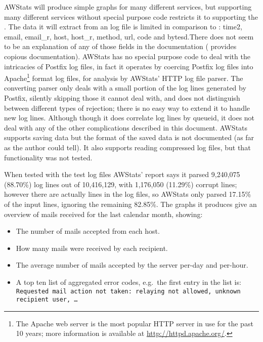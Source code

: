 AWStats will produce simple graphs for many different services, but
supporting many different services without special purpose code restricts
it to supporting the \LCD{}.  The data it will extract from an \MTA{} log
file is limited in comparison to \parsername{}: \newline \tab{} time2,
email, email\_r, host, host\_r, method, url, code and bytesd.\newline There
does not seem to be an explanation of any of those fields in the
documentation (\parsername{} provides copious documentation).  AWStats has
no special purpose code to deal with the intricacies of Postfix log files,
in fact it operates by coercing Postfix log files into Apache\footnote{The
Apache web server is the most popular HTTP server in use for the past 10
years; more information is available at \url{http://httpd.apache.org/}.}
format log files, for analysis by AWStats' HTTP log file parser.  The
converting parser only deals with a small portion of the log lines
generated by Postfix, silently skipping those it cannot deal with, and does
not distinguish between different types of rejection; there is no easy way
to extend it to handle new log lines.  Although though it does correlate
log lines by queueid, it does not deal with any of the other complications
described in this document.  AWStats supports saving data but the format of
the saved data is not documented (as far as the author could tell).  It
also supports reading compressed log files, but that functionality was not
tested.

When tested with the \numberOFlogFILES{} test log files AWStats' report
says it parsed 9,240,075 (88.70\%) log lines out of 10,416,129, with
1,176,050 (11.29\%) corrupt lines; however there are actually
\numberOFlogLINES{} lines in the \numberOFlogFILES{} log files, so AWStats
only parsed 17.15\% of the input lines, ignoring the remaining 82.85\%.
The graphs it produces give an overview of mails received for the last
calendar month, showing:

\begin{itemize}

    \item The number of mails accepted from each host.

    \item How many mails were received by each recipient.

    \item The average number of mails accepted by the server per-day and
        per-hour.

    \item A top ten list of aggregated \SMTP{} error codes, e.g.\ the first
        entry in the list is: \texttt{Requested mail action not taken:
        relaying not allowed, unknown recipient user, \ldots}

\end{itemize}

